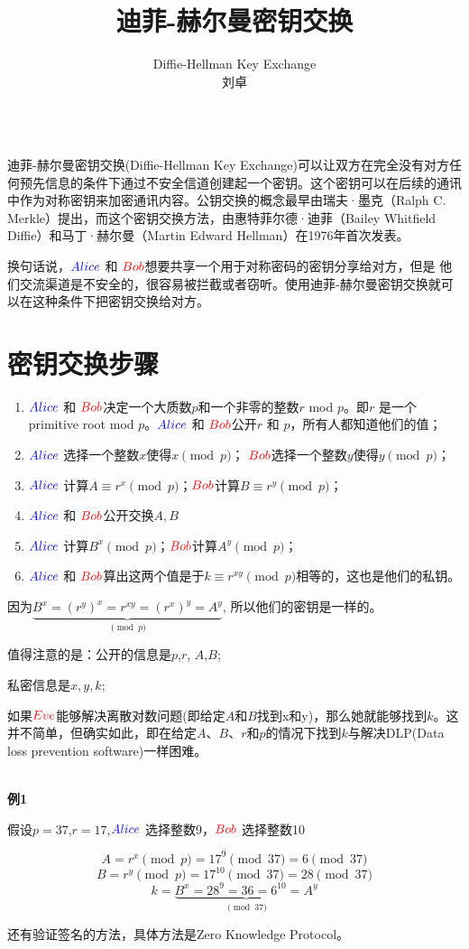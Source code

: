 \documentclass{article}
\date{}
\title{迪菲-赫尔曼密钥交换}
\author{
Diffie-Hellman Key Exchange\\
 刘卓\\
 \texttt{ } \\
}
\begin{document}
\maketitle

迪菲-赫尔曼密钥交换(Diffie-Hellman Key Exchange)可以让双方在完全没有对方任何预先信息的条件下通过不安全信道创建起一个密钥。这个密钥可以在后续的通讯中作为对称密钥来加密通讯内容。公钥交换的概念最早由瑞夫·墨克（Ralph C. Merkle）提出，而这个密钥交换方法，由惠特菲尔德·迪菲（Bailey Whitfield Diffie）和马丁·赫尔曼（Martin Edward Hellman）在1976年首次发表。

换句话说，${\color{blue}Alice}$ 和 ${\color{red}Bob}$想要共享一个用于对称密码的密钥分享给对方，但是
他们交流渠道是不安全的，很容易被拦截或者窃听。使用迪菲-赫尔曼密钥交换就可以在这种条件下把密钥交换给对方。

\section{密钥交换步骤}
\begin{enumerate}
\item ${\color{blue}Alice}$ 和 ${\color{red}Bob}$决定一个大质数$p$和一个非零的整数$r$ mod $p$。即$r$ 是一个primitive root mod $p$。${\color{blue}Alice}$ 和 ${\color{red}Bob}$公开$r$ 和 $p$，所有人都知道他们的值；
\item ${\color{blue}Alice}$ 选择一个整数$x$使得$x \pmod{p}$； ${\color{red}Bob}$选择一个整数$y$使得$y \pmod{p}$；
\item ${\color{blue}Alice}$ 计算$A \equiv r^x \pmod{p}$；${\color{red}Bob}$计算$B \equiv r^y  \pmod{p}$；
\item ${\color{blue}Alice}$ 和 ${\color{red}Bob}$公开交换$A,B$
\item ${\color{blue}Alice}$ 计算$B^x \pmod{p}$；${\color{red}Bob}$计算$A^y \pmod{p}$；
\item ${\color{blue}Alice}$ 和 ${\color{red}Bob}$算出这两个值是于$k \equiv r^{xy} \pmod{p}$相等的，这也是他们的私钥。
\end{enumerate}

因为$\underbrace{B^x  = (r^y)^x  = r^{xy} = (r^x)^y  = A^y}_{\pmod{p}} $, 所以他们的密钥是一样的。

值得注意的是：公开的信息是$p$,$r$, $A$,$B$;

私密信息是$x,y,k$;

如果${\color{red}Eve}$能够解决离散对数问题(即给定$A$和$B$找到x和y)，那么她就能够找到$k$。这并不简单，但确实如此，即在给定$A$、$B$、$r$和$p$的情况下找到$k$与解决DLP(Data loss prevention software)一样困难。

~\\

\textbf{例1}

假设$p = 37$,$r=17$,${\color{blue}Alice}$ 选择整数9，${\color{red}Bob}$ 选择整数10

$$A = r^x \pmod{p} = 17^9 \pmod{37} = 6 \pmod{37}  $$
$$B = r^y \pmod{p} = 17^{10} \pmod{37} = 28 \pmod{37}  $$
$$k = \underbrace{ B^x= 28^{9} =  36 = 6^{10} = A^y}_{\pmod{37} }$$

还有验证签名的方法，具体方法是Zero Knowledge Protocol。
\end{document}
